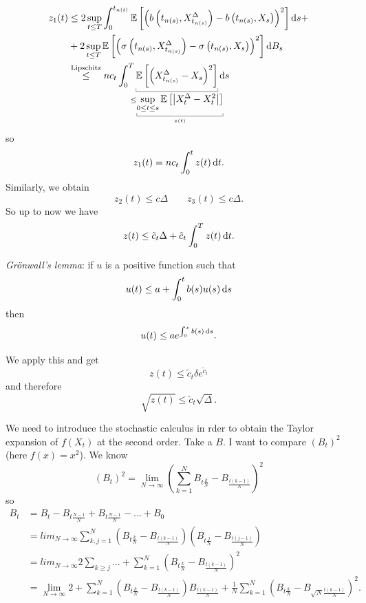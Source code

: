 \documentclass[12pt]{report}
\begin{document}
\begin{fancyproof}
\begin{align*}
		z_1(t)&\leq2\sup_{t\leq T}\int_{0}^{t_{n(t)}}\ev{\left(b\left(t_{n(s)},X^{\Delta}_{t_{n(s)}}\right)-b\left(t_{n(s)},X_{s}\right)\right)^{2}}\ds+\\
		&+2\sup_{t\leq T}\ev{\left(\sigma\left(t_{n(s)},X^{\Delta}_{t_{n(s)}}\right)-\sigma\left(t_{n(s)},X_{s}\right)\right)^{2}}\dif B_s\\
		&\overset{\text{Lipschitz}}{\leq}n c_t\int_{0}^{T}\ubracketthin{\ev{\left(X^{\Delta}_{t_{n(s)}}-X_{s}\right)^{2}}}_{\mathclap{\leq\ubracketthin{\sup_{0\leq t\leq s}\ev{\left|X^{\Delta}_{t}-X_{t}^{2}\right|}}_{z(t)}}}\ds
			\end{align*}
	so
	\begin{equation*}
		z_1(t)=nc_{t}\int_{0}^{t}z(t)\mathop{}\!\mathrm{d} t.
	\end{equation*}
	Similarly, we obtain
	\begin{equation*}
		z_2(t)\leq c\Delta\qquad z_3(t)\leq c\Delta.
	\end{equation*}
	So up to now we have
	\begin{equation*}
		z(t)\leq \tilde{c}_{t}\Delta+\tilde{c}_{t}\int_{0}^{T}z(t)\mathop{}\!\mathrm{d} t.
	\end{equation*}
	\begin{lemma}
		\emph{Grönwall's lemma}: if $u$ is a positive function such that
		\begin{equation*}
			u(t)\leq a+\int_{0}^{t}b(s)u(s)\mathop{}\!\mathrm{d} s
		\end{equation*}
		then
		\begin{equation*}
			u(t)\leq ae^{\int_{0}^{x}b(s)\mathop{}\!\mathrm{d} s}.
		\end{equation*}
	\end{lemma}
	We apply this and get
	\begin{equation*}
		z(t)\leq\tilde{c}_{t}\delta e^{\tilde{c}_{t}}
	\end{equation*}
	and therefore
	\begin{equation*}
		\sqrt{z(t)}\leq \tilde{c}_{t}\sqrt{\Delta}.
	\end{equation*}
\end{fancyproof}
We need to introduce the stochastic calculus in rder to obtain the Taylor expansion of $f(X_{t})$ at the second order. Take a \bwm{} $B$. I want to compare $(B_{t})^{2}$ (here $f(x)=x^{2}$). We know
\begin{equation*}
	(B_{t})^{2}=\lim_{N\to\infty}\left(\sum_{k=1}^{N}B_{t\frac{k}{N}}-B_{\frac{t(k-1)}{N}}\right)^{2}
\end{equation*}
so
\begin{align*}
	B_{t}&=B_{t}-B_{t\frac{N-1}{N}}+B_{t\frac{N-1}{N}}-\ldots+B_{0}\\
		&=lim_{N\to\infty}\sum_{k,j=1}^{N}\left(B_{t\frac{k}{N}}-B_{\frac{t(k-1)}{N}}\right)\left(B_{t\frac{j}{N}}-B_{\frac{t(j-1)}{N}}\right)\\
		&=lim_{N\to\infty}2\sum_{k\geq j}\ldots+\sum_{k=1}^{N}\left(B_{t\frac{k}{N}}-B_{\frac{t(k-1)}{N}}\right)^{2}\\
		&=\lim_{N\to\infty}2+\sum_{k=1}^{N}\left(B_{t\frac{k}{N}}-B_{\frac{t(k-1)}{N}}\right)B_{\frac{t(k-1)}{N}}+\frac{1}{N}\sum_{k=1}^{N}\left(B_{t\frac{k}{N}}-B_{\sqrt{N}\frac{t(k-1)}{N}}\right)^{2}.
\end{align*}
\end{document}
